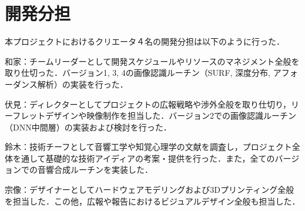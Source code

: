 \section{開発分担}%
本プロジェクトにおけるクリエータ４名の開発分担は以下のように行った．

和家：チームリーダーとして開発スケジュールやリソースのマネジメント全般を取り仕切った．バージョン1, 3, 4の画像認識ルーチン（SURF, 深度分布, アフォーダンス解析）の実装を行った．

伏見：ディレクターとしてプロジェクトの広報戦略や渉外全般を取り仕切り，リーフレットデザインや映像制作を担当した．バージョン2での画像認識ルーチン（DNN中間層）の実装および検討を行った．

鈴木：技術チーフとして音響工学や知覚心理学の文献を調査し，プロジェクト全体を通して基礎的な技術アイディアの考案・提供を行った．また，全てのバージョンでの音響合成ルーチンを実装した．

宗像：デザイナーとしてハードウェアモデリングおよび3Dプリンティング全般を担当した．この他，広報や報告におけるビジュアルデザイン全般も担当した．

